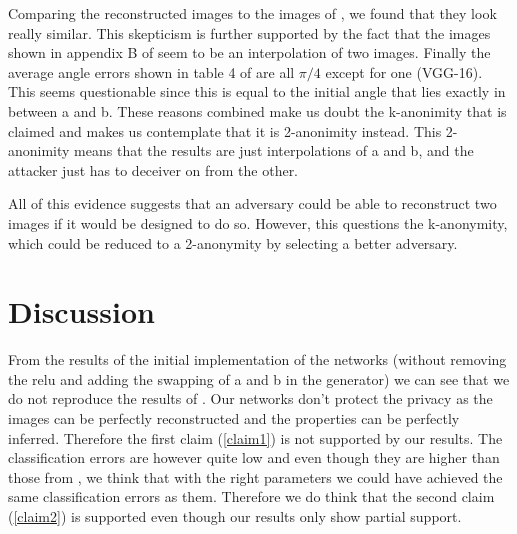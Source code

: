 Comparing the reconstructed images to the images of \cite{xiang2020interpretable}, we found that they look really similar.
This skepticism is further supported by the fact that the images shown in appendix B of \cite{xiang2020interpretable} seem to be an interpolation of two images. Finally the average angle errors shown in table 4 of \cite{xiang2020interpretable} are all $\pi/4$ except for one (VGG-16). This seems questionable since this is equal to the initial angle that lies exactly in between a and b. These reasons combined make us doubt the k-anonimity that is claimed and makes us contemplate that it is 2-anonimity instead. This 2-anonimity means that the results are just interpolations of a and b, and the attacker just has to deceiver on from the other.

All of this evidence suggests that an adversary could be able to reconstruct two images if it would be designed to do so. However, this questions the k-anonymity, which could be reduced to a 2-anonymity by selecting a better adversary.



\section{Discussion}\label{Discussion}


From the results of the initial implementation of the networks (without removing the relu and adding the swapping of a and b in the generator) we can see that we do not reproduce the results of \cite{xiang2020interpretable}. Our networks don't protect the privacy as the images can be perfectly reconstructed and the properties can be perfectly inferred. Therefore the first claim (\ref{claim1}) is not supported by our results. The classification errors are however quite low and even though they are higher than those from \cite{xiang2020interpretable}, we think that with the right parameters we could have achieved the same classification errors as them. Therefore we do think that the second claim (\ref{claim2}) is supported even though our results only show partial support.

